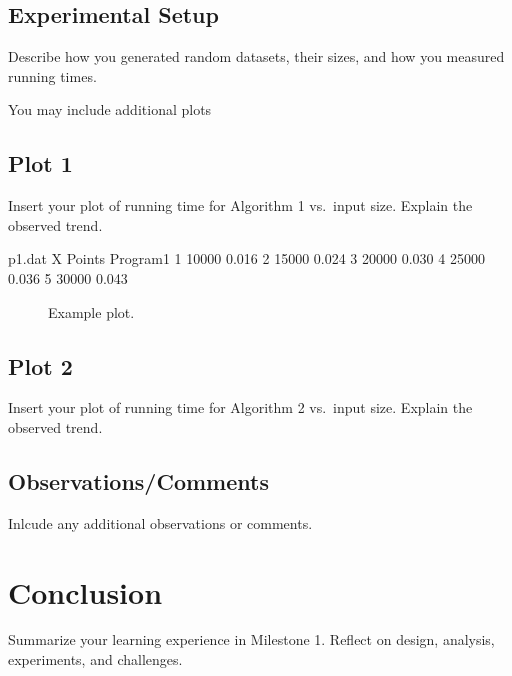 \documentclass{article}
\begin{document}
\subsection{Experimental Setup}
{\color{red} Describe how you generated random datasets, their sizes, and how you measured running times.

You may include additional plots


}

\subsection{Plot 1}
{\color{red} Insert your plot of running time for Algorithm 1 vs.\ input size. Explain the observed trend.}

\begin{filecontents}{p1.dat}
X   Points   Program1
1   10000    0.016
2   15000    0.024
3   20000    0.030
4   25000    0.036
5   30000    0.043
\end{filecontents}

\begin{figure}[H]
\centering
{}
\caption{Example plot.}
\label{plot1}
\end{figure}

\subsection{Plot 2}
{\color{red} Insert your plot of running time for Algorithm 2 vs.\ input size. Explain the observed trend.}

\subsection{Observations/Comments}
{\color{red} Inlcude any additional observations or comments.}

\section{Conclusion}
{\color{red} Summarize your learning experience in Milestone 1. Reflect on design, analysis, experiments, and challenges.}
\end{document}
